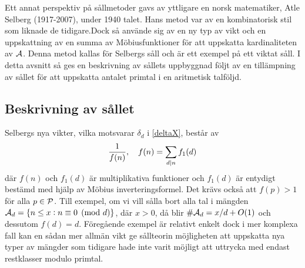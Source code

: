 Ett annat perspektiv på sållmetoder gavs av yttligare en norsk matematiker, Atle Selberg (1917-2007), under 1940 talet. 
Hans metod var av en kombinatorisk stil som liknade de tidigare.Dock så använde sig av en ny typ av vikt och en uppskattning av en summa av Möbiusfunktioner för att uppskatta kardinaliteten av \(\A\).
Denna metod kallas för Selbergs såll och är ett exempel på ett viktat såll. I detta avsnitt så ges en beskrivning av sållets uppbyggnad följt av en tillämpning av sållet för att uppskatta antalet primtal i en aritmetisk talföljd.

\subsection{Beskrivning av sållet}
Selbergs nya vikter, vilka motsvarar \(\delta_d\) i \eqref{deltaX}, består av
\begin{equation}
    \frac{1}{f(n)},\quad f(n) = \sum_{d\divides n}f_1(d)\nonumber
\end{equation}
där \(f(n)\) och \(f_1(d)\) är multiplikativa funktioner och \(f_1(d)\) är entydigt bestämd med hjälp av Möbius inverteringsformel. Det krävs också att \(f(p) > 1\) för alla \(p\in\P\).
Till exempel, om vi vill sålla bort alla tal i mängden \(\A_d = \{n\leq x:n \equiv 0 \pmod{d}\}\), där \(x>0\), då blir \(\#\A_d = x/d + O(1)\) och dessutom \(f(d) = d\).
Föregående exempel är relativt enkelt dock i mer komplexa fall kan en sådan mer allmän vikt ge sållteorin möjligheten att uppskatta nya typer av mängder som tidigare hade inte varit möjligt att uttrycka med endast restklasser modulo primtal. 

